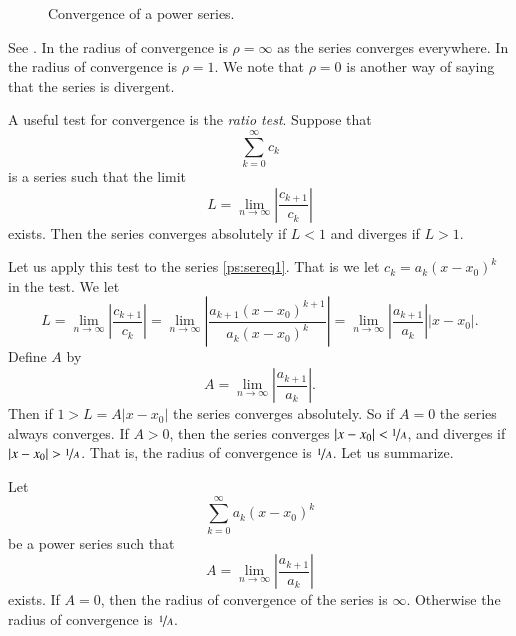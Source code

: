 \documentclass[12pt]{book}
\begin{document}
\begin{figure}[h!t]
\capstart
\begin{center}
\caption{Convergence of a power series.\label{ps:convfig}}
\end{center}
\end{figure}

See .
In  the radius of convergence is $\rho = \infty$
as the series converges everywhere.  In 
the radius of convergence is $\rho=1$.
We note that $\rho = 0$ is another way of saying that the series is
divergent.

A useful test for convergence is the
\emph{ratio test}.  Suppose that
\begin{equation*}
\sum_{k=0}^\infty c_k
\end{equation*}
is a series such that the limit
\begin{equation*}
L = \lim_{n\to\infty} \left \lvert \frac{c_{k+1}}{c_k} \right \rvert
\end{equation*}
exists.  Then the series converges absolutely if $L < 1$ and diverges
if $L > 1$.

Let us apply this test to the series \eqref{ps:sereq1}.  That is
we let $c_k = a_k {(x - x_0)}^k$ in the test.  We let
\begin{equation*}
L = \lim_{n\to\infty} \left \lvert \frac{c_{k+1}}{c_k} \right \rvert
=
\lim_{n\to\infty} \left \lvert
\frac{a_{k+1} {(x - x_0)}^{k+1}}{a_k {(x - x_0)}^k}
\right \rvert
=
\lim_{n\to\infty} \left \lvert
\frac{a_{k+1}}{a_k}
\right \rvert
\lvert  x - x_0 \rvert .
\end{equation*}
Define $A$ by
\begin{equation*}
A =
\lim_{n\to\infty} \left \lvert
\frac{a_{k+1}}{a_k}
\right \rvert .
\end{equation*}
Then if $1 > L = A \lvert x - x_0 \rvert$ the series converges absolutely.
So if $A = 0$ the series always converges.  If $A > 0$, then
the series converges $\lvert x - x_0 \rvert < \nicefrac{1}{A}$,
and diverges if $\lvert x - x_0 \rvert > \nicefrac{1}{A}$.  That is,
the radius of convergence is $\nicefrac{1}{A}$.  Let us summarize.

\begin{theorem}
Let
\begin{equation*}
\sum_{k=0}^\infty a_k {(x-x_0)}^k
\end{equation*}
be a power series such that
\begin{equation*}
A =
\lim_{n\to\infty}
\left \lvert
\frac{a_{k+1}}{a_k}
\right \rvert
\end{equation*}
exists.  If $A = 0$, then the radius of convergence of the series
is $\infty$.  Otherwise the radius of convergence is $\nicefrac{1}{A}$.
\end{theorem}
\end{document}
